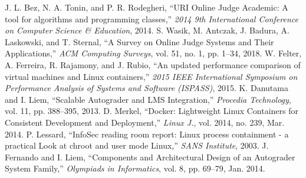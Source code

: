 \documentclass[conference,a4paper]{IEEEtran}
\begin{document}
\begin{thebibliography}{00}

 J. L. Bez, N. A. Tonin, and P. R. Rodegheri, ``URI Online Judge Academic: A tool for algorithms and programming classes,'' \textit{2014 9th International Conference on Computer Science \& Education}, 2014.
 S. Wasik, M. Antczak, J. Badura, A. Laskowski, and T. Sternal, ``A Survey on Online Judge Systems and Their Applications,'' \textit{ACM Computing Surveys}, vol. 51, no. 1, pp. 1–34, 2018.
 W. Felter, A. Ferreira, R. Rajamony, and J. Rubio, ``An updated performance comparison of virtual machines and Linux containers,'' \textit{2015 IEEE International Symposium on Performance Analysis of Systems and Software (ISPASS)}, 2015.
 K. Danutama and I. Liem, ``Scalable Autograder and LMS Integration,'' \textit{Procedia Technology}, vol. 11, pp. 388–395, 2013.
 D. Merkel, ``Docker: Lightweight Linux Containers for Consistent Development and Deployment,'' \textit{Linux J.}, vol. 2014, no. 239, Mar. 2014.
 P. Lessard, ``InfoSec reading room report: Linux process containment - a practical Look at chroot and user mode Linux,'' \textit{SANS Institute}, 2003.
 J. Fernando and I. Liem, ``Components and Architectural Design of an Autograder System Family,'' \textit{Olympiads in Informatics}, vol. 8, pp. 69–79, Jan. 2014.

\end{thebibliography}
\end{document}
